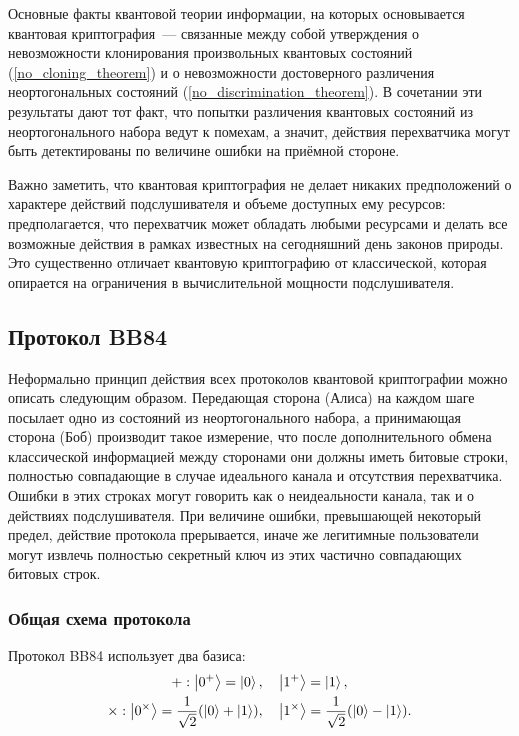 Основные факты квантовой теории информации, на которых основывается квантовая криптография~--- связанные между собой утверждения о невозможности клонирования произвольных квантовых состояний (\ref{no_cloning_theorem}) и о невозможности достоверного различения неортогональных состояний (\ref{no_discrimination_theorem}). В сочетании эти результаты дают тот факт, что попытки различения квантовых состояний из неортогонального набора ведут к помехам, а значит, действия перехватчика могут быть детектированы по величине ошибки на приёмной стороне.

Важно заметить, что квантовая криптография не делает никаких предположений о характере действий подслушивателя и объеме доступных ему ресурсов: предполагается, что перехватчик может обладать любыми ресурсами и делать все возможные действия в рамках известных на сегодняшний день законов природы. Это существенно отличает квантовую криптографию от классической, которая опирается на ограничения в вычислительной мощности подслушивателя.

\subsection{Протокол BB84}
Неформально принцип действия всех протоколов квантовой криптографии можно описать следующим образом. Передающая сторона (Алиса) на каждом шаге посылает одно из состояний из неортогонального набора, а принимающая сторона (Боб) производит такое измерение, что после дополнительного обмена классической информацией между сторонами они должны иметь битовые строки, полностью совпадающие в случае идеального канала и отсутствия перехватчика. Ошибки в этих строках могут говорить как о неидеальности канала, так и о действиях подслушивателя. При величине ошибки, превышающей некоторый предел, действие протокола прерывается, иначе же легитимные пользователи могут извлечь полностью секретный ключ из этих частично совпадающих битовых строк.

\subsubsection{Общая схема протокола}
Протокол BB84 \cite{bb84} использует два базиса:
\begin{gather}
  +: \left| 0^+ \right\rangle = \left| 0 \right\rangle,\quad \left| 1^+ \right\rangle = \left| 1 \right\rangle, \nonumber\\
  \times: \left| 0^\times \right\rangle = \frac{1}{\sqrt{2}}(\left| 0 \right\rangle + \left| 1 \right\rangle),\quad \left| 1^\times \right\rangle = \frac{1}{\sqrt{2}}(\left| 0 \right\rangle - \left| 1 \right\rangle).
\end{gather}

